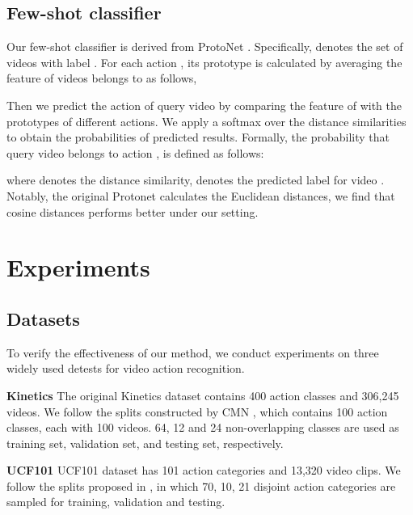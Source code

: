 \documentclass[sigconf]{acmart}
\begin{document}
	\subsection{Few-shot classifier}\label{sec:classifier} 
	Our few-shot classifier is derived from ProtoNet \cite{snell2017prototypical}.
	Specifically,  denotes the set of videos with label . 
	For each action , its prototype  is calculated by averaging the feature of videos belongs to  as follows,
	
	
	
	Then we predict the action of query video  by comparing the feature of  with the prototypes of different actions. We apply a softmax over the distance similarities to obtain the probabilities of predicted results. Formally, the 
	probability that query video  belongs to action , is defined as follows:
	
	\noindent where  denotes the distance similarity,  denotes the predicted label for video . Notably, the original Protonet calculates the Euclidean distances, we find that cosine
	distances performs better under our setting. 
	
	
	
	
	
	
	
	
	
	
	
	
\section{Experiments}
	\subsection{Datasets}
	To verify the effectiveness of our method, we conduct experiments on three widely used detests for video action recognition.
	
	\noindent\textbf{Kinetics} 
	The original Kinetics dataset \cite{kay2017kinetics} contains 400 action classes and 306,245 videos. We follow the splits constructed by CMN \cite{zhu2018compound}, which contains 100 action classes, each with 100 videos. 
	64, 12 and 24 non-overlapping classes are used as training set, validation set, and testing set, respectively.
	
	\noindent\textbf{UCF101} 
	UCF101 dataset \cite{soomro2012ucf101} has 101 action categories and 13,320 video clips. 
	We follow the splits proposed in \cite{zhang2020few}, in which 70, 10, 21 disjoint action categories are sampled for training, validation and testing.
	
\end{document}
